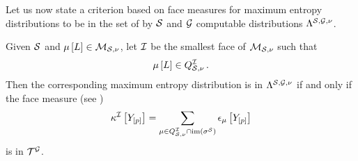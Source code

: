
Let us now state a criterion based on face measures for maximum entropy distributions to be in the set of by $\mathcal{S}$ and $\mathcal{G}$ computable distributions $\Lambda^{\mathcal{S},\mathcal{G},\nu}$.

\begin{theorem}
    \label{the:tnRepresentationMaxEntropy}
    Given $\mathcal{S}$ and $\mu\left[L\right]\in\mathcal{M}_{\mathcal{S},\nu}$, let $\mathcal{I}$ be the smallest face of $\mathcal{M}_{\mathcal{S},\nu}$ such that
    \begin{align*}
        \mu\left[L\right] \in Q^{\mathcal{I}}_{\mathcal{S},\nu} \, .
    \end{align*}
    Then the corresponding maximum entropy distribution is in $\Lambda^{\mathcal{S},\mathcal{G},\nu}$ if and only if the face measure (see )
    \begin{align*}
        \kappa^{\mathcal{I}}\left[Y_{[p]}\right]
        = \sum_{\mu\in Q^{\mathcal{I}}_{\mathcal{S},\nu}\cap\mathrm{im}\left(\sigma^{\mathcal{S}}\right)} \epsilon_{\mu}\left[Y_{[p]}\right]
    \end{align*}
    is in $\mathcal{T}^{\mathcal{G}}$.
\end{theorem}
